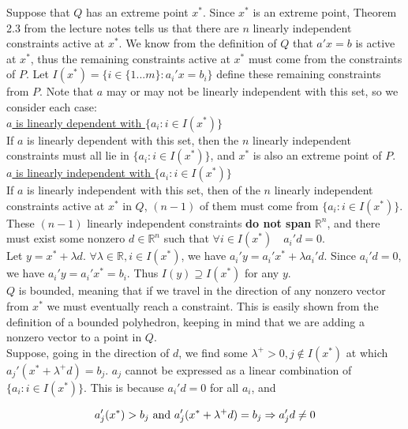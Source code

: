 \documentclass[11pt]{article}
\begin{document}
Suppose that $Q$ has an extreme point $x^*$. Since $x^*$ is an extreme point, Theorem 2.3 from the lecture notes tells us that there are $n$ linearly independent constraints active at $x^*$. We know from the definition of $Q$ that $a'x=b$ is active at $x^*$, thus the remaining constraints active at $x^*$ must come from the constraints of $P$. Let $I(x^*)=\{i\in\{1...m\}:a_i'x=b_i\}$ define these remaining constraints from $P$. Note that $a$ may or may not be linearly independent with this set, so we consider each case:\\

\underline{$a$ is linearly dependent with $\{a_i:i\in I(x^*)\}$}\\

If $a$ is linearly dependent with this set, then the $n$ linearly independent constraints must all lie in $\{a_i:i\in I(x^*)\}$, and $x^*$ is also an extreme point of $P$.\\

\underline{$a$ is linearly independent with $\{a_i:i\in I(x^*)\}$}\\

If $a$ is linearly independent with this set, then of the $n$ linearly independent constraints active at $x^*$ in $Q$, $(n-1)$ of them must come from  $\{a_i:i\in I(x^*)\}$. These $(n-1)$ linearly independent constraints \textbf{do not span} $\mathbb{R}^n$, and there must exist some nonzero $d\in\mathbb{R}^n$ such that $\forall i\in I(x^*)\quad a_i'd=0$.\\

Let $y=x^*+\lambda d$. $\forall \lambda\in\mathbb{R}, i\in I(x^*)$, we have $a_i'y=a_i'x^*+\lambda a_i'd$. Since $a_i'd=0$, we have $a_i'y = a_i'x^*=b_i$. Thus $I(y)\supseteq I(x^*)$ for any $y$. \\

$Q$ is bounded, meaning that if we travel in the direction of any nonzero vector from $x^*$ we must eventually reach a constraint. This is easily shown from the definition of a bounded polyhedron, keeping in mind that we are adding a nonzero vector to a point in $Q$.\\

Suppose, going in the direction of $d$, we find some $\lambda^+>0, j\notin I(x^*)$ at which $a_j'(x^*+\lambda^+d)=b_j$. $a_j$ cannot be expressed as a linear combination of $\{a_i: i\in I(x^*)\}$. This is because $a_i'd=0$ for all $a_i$, and

$$
a_j'(x^*)>b_j \text{ and } a_j'(x^* + \lambda^+ d) = b_j \Rightarrow a_j'd \neq 0\\
$$
\end{document}
